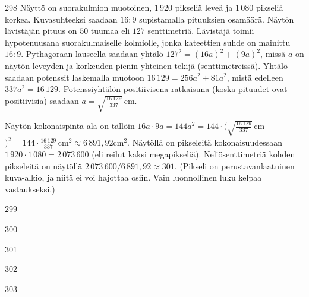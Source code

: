\begin{Vastaus}{298}
Näyttö on suorakulmion muotoinen, $1\,920$ pikseliä leveä ja $1\,080$ pikseliä korkea. Kuvasuhteeksi saadaan $16:9$ supistamalla pituuksien osamäärä. Näytön lävistäjän pituus on $50$ tuumaa eli $127$ senttimetriä. Lävistäjä toimii hypotenuusana suorakulmaiselle kolmiolle, jonka kateettien suhde on mainittu $16:9$. Pythagoraan lauseella saadaan yhtälö $127^2=(16a)^2+(9a)^2$, missä $a$ on näytön leveyden ja korkeuden pienin yhteinen tekijä (senttimetreissä). Yhtälö saadaan potenssit laskemalla muotoon $16\,129=256a^2+81a^2$, mistä edelleen $337a^2=16\,129$. Potenssiyhtälön positiivisena ratkaisuna (koska pituudet ovat positiivisia) saadaan $a=\sqrt{\frac{16\,129}{337}}$\,cm.

Näytön kokonaispinta-ala on tällöin $16a\cdot 9a=144a^2=144\cdot (\sqrt{\frac{16\,129}{337}}$\,cm$)^2=144\cdot\frac{16\,129}{337}$\,cm$^2\approx 6\,891,92$cm$^2$. Näytöllä on pikseleitä kokonaisuudessaan $1\,920\cdot 1\,080=2\,073\,600$ (eli reilut kaksi megapikseliä). Neliösenttimetriä kohden pikseleitä on näytöllä $2\,073\,600/6\,891,92 \approx 301$. (Pikseli on perustavanlaatuinen kuva-alkio, ja niitä ei voi hajottaa osiin. Vain luonnollinen luku kelpaa vastaukseksi.)
	
\end{Vastaus}
\begin{Vastaus}{299}
	
\end{Vastaus}
\begin{Vastaus}{300}
	
\end{Vastaus}
\begin{Vastaus}{301}
	
\end{Vastaus}
\begin{Vastaus}{302}
    
\end{Vastaus}
\begin{Vastaus}{303}
	
\end{Vastaus}
